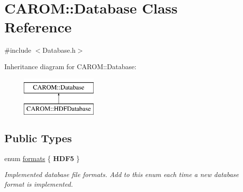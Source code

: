 \hypertarget{class_c_a_r_o_m_1_1_database}{\section{C\-A\-R\-O\-M\-:\-:Database Class Reference}
\label{class_c_a_r_o_m_1_1_database}
}


{\ttfamily \#include $<$Database.\-h$>$}

Inheritance diagram for C\-A\-R\-O\-M\-:\-:Database\-:\begin{figure}[H]
\begin{center}
\leavevmode
\includegraphics[height=2.000000cm]{class_c_a_r_o_m_1_1_database}
\end{center}
\end{figure}
\subsection*{Public Types}
\begin{DoxyCompactItemize}
\item 
enum \hyperlink{class_c_a_r_o_m_1_1_database_a8ab29ee6466ef8415ee0ef93d94cc5f7}{formats} \{ {\bfseries H\-D\-F5}
 \}
\begin{DoxyCompactList}\small\item\em Implemented database file formats. Add to this enum each time a new database format is implemented. \end{DoxyCompactList}\end{DoxyCompactItemize}
